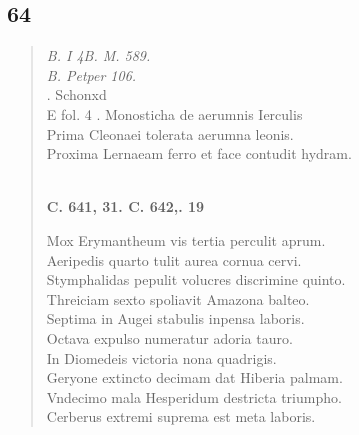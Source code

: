 \documentclass[11pt, a4paper]{report}
\begin{document}
            \subsection*{64}
      \begin{verse}
      \textit{B. I 4B. M. 589.} \\ \textit{B. Petper 106.} \\ . Schonxd \\ E fol. 4 . Monosticha de aerumnis Ierculis \\ Prima Cleonaei tolerata aerumna leonis. \\ Proxima Lernaeam ferro et face contudit hydram. \\ 
        ﻿\pagebreak 
    \begin{center} \textbf{C. 641, 31. C. 642,. 19} \end{center} \marginpar{[108]} Mox Erymantheum vis tertia perculit aprum. \\ Aeripedis quarto tulit aurea cornua cervi. \\ Stymphalidas pepulit volucres discrimine quinto. \\ Threiciam sexto spoliavit Amazona balteo. \\ Septima in Augei stabulis inpensa laboris. \\ Octava expulso numeratur adoria tauro. \\ In Diomedeis victoria nona quadrigis. \\ Geryone extincto decimam dat Hiberia palmam. \\ Vndecimo mala Hesperidum destricta triumpho. \\ Cerberus extremi suprema est meta laboris. \\ 
      \end{verse}
  
\end{document}
